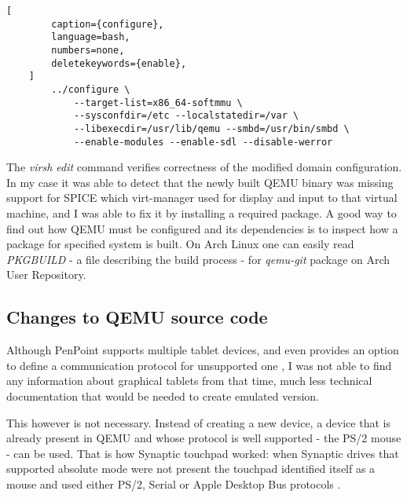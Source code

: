 \begin{codeblock}
    \begin{lstlisting}[
        caption={configure},
        language=bash,
        numbers=none,
        deletekeywords={enable},
    ]
        ../configure \
            --target-list=x86_64-softmmu \
            --sysconfdir=/etc --localstatedir=/var \
            --libexecdir=/usr/lib/qemu --smbd=/usr/bin/smbd \
            --enable-modules --enable-sdl --disable-werror
    \end{lstlisting}
\end{codeblock}

The \emph{virsh edit} command verifies correctness of the modified domain
configuration.  In my case it was able to detect that the newly built QEMU
binary was missing support for SPICE which virt-manager used for display and
input to that virtual machine, and I was able to fix it by installing a required
package.  A good way to find out how QEMU must be configured and its
dependencies is to inspect how a package for specified system is built.  On Arch
Linux one can easily read \emph{PKGBUILD} - a file describing the build process
- for \emph{qemu-git} package on Arch User Repository.

\subsection{Changes to QEMU source code}


Although PenPoint supports multiple tablet devices, and even provides an option
to define a communication protocol for unsupported one \cite{godevtools}, I was
not able to find any information about graphical tablets from that time, much
less technical documentation that would be needed to create emulated version.

This however is not necessary.  Instead of creating a new device, a device that
is already present in QEMU and whose protocol is well supported - the PS/2 mouse
- can be used.  That is how Synaptic touchpad worked: when Synaptic drives that
supported absolute mode were not present the touchpad identified itself as
a mouse and used either PS/2, Serial or Apple Desktop Bus protocols
\cite{synapticsinterfacing}.

